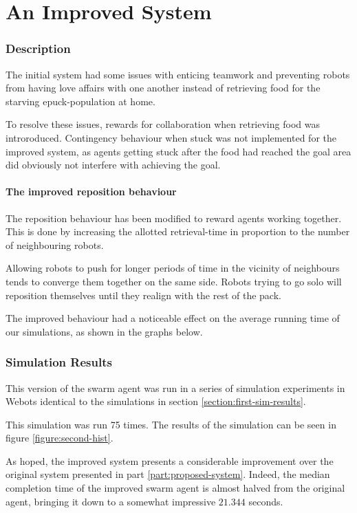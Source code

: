 \documentclass[a4paper]{article}
\begin{document}
\part{An Improved System}

\section{Description}
The initial system had some issues with enticing teamwork and preventing robots from having love affairs with one another instead of retrieving food for the starving epuck-population at home.

To resolve these issues, rewards for collaboration when retrieving food was introroduced.
Contingency behaviour when stuck was not implemented for the improved system, as agents getting stuck after the food had reached the goal area did obviously not interfere with achieving the goal.

\subsection{The improved reposition behaviour}
The reposition behaviour has been modified to reward agents working together. This is done by increasing the allotted retrieval-time in proportion to the number of neighbouring robots.

Allowing robots to push for longer periods of time in the vicinity of neighbours tends to converge them together on the same side. Robots trying to go solo will reposition themselves until they realign with the rest of the pack.

The improved behaviour had a noticeable effect on the average running time of our simulations, as shown in the graphs below.

\section{Simulation Results}
This version of the swarm agent was run in a series of simulation experiments in Webots identical to the simulations in section \vref{section:first-sim-results}.

This simulation was run 75 times.
The results of the simulation can be seen in figure \vref{figure:second-hist}.

As hoped, the improved system presents a considerable improvement over the original system presented in part \vref{part:proposed-system}.
Indeed, the median completion time of the improved swarm agent is almost halved from the original agent, bringing it down to a somewhat impressive $ 21.344 $ seconds.
\end{document}
